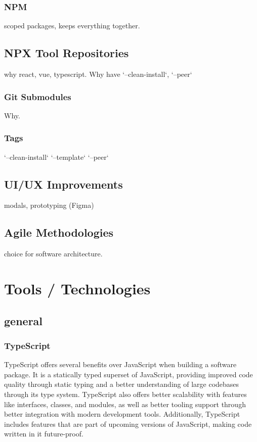\documentclass{l4proj}
\begin{document}
\subsection{NPM}
\text scoped packages, keeps everything together.
\section{NPX Tool Repositories}
\text why react, vue, typescript. Why have `--clean-install`, `--peer`
\subsection{Git Submodules}
\text Why.
\subsection{Tags}
\text `--clean-install` `--template` `--peer`
\section{UI/UX Improvements}
\text modals, prototyping (Figma)
\section{Agile Methodologies}
\text choice for software architecture.
\chapter{Tools / Technologies}

\section{general}

\subsection{TypeScript}
\text TypeScript offers several benefits over JavaScript when building a software package. It is a statically typed superset of JavaScript, providing improved code quality through static typing and a better understanding of large codebases through its type system. TypeScript also offers better scalability with features like interfaces, classes, and modules, as well as better tooling support through better integration with modern development tools. Additionally, TypeScript includes features that are part of upcoming versions of JavaScript, making code written in it future-proof.
\end{document}
